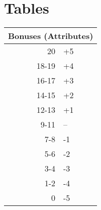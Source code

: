 \chapter{Tables}

\begin{tabular}{ |r|l| }
  \hline
  \multicolumn{2}{|c|}{Bonuses (Attributes)} \\
  \hline
  20 & +5 \\
  18-19 & +4 \\
  16-17 & +3 \\
  14-15 & +2 \\
  12-13 & +1 \\
  9-11 & -- \\
  7-8 & -1 \\
  5-6 & -2 \\
  3-4 & -3 \\
  1-2 & -4 \\
  0 & -5 \\
  \hline
\end{tabular}